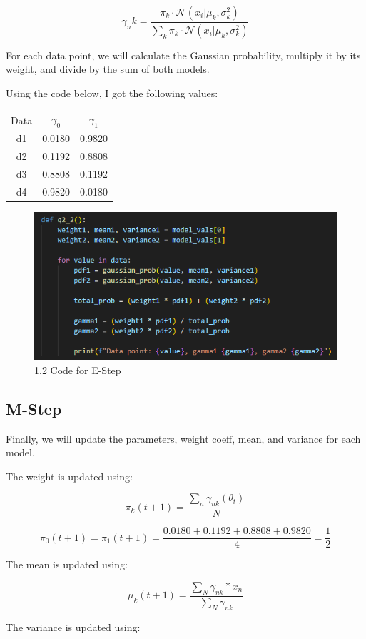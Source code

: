 \documentclass{article}
\begin{document}
\[\gamma_nk = \frac{\pi_k \cdot \mathcal{N}(x_i | \mu_k, \sigma_k^2) }{\sum_{k}\pi_k \cdot \mathcal{N}(x_i | \mu_k, \sigma_k^2)} \]

For each data point, we will calculate the Gaussian probability, multiply it by its weight, and divide by the sum of both models.

Using the code below, I got the following values:

\begin{center}
\begin{tabular}{ c c c }
 Data & $\gamma_0$ & $\gamma_1$ \\
 d1 & 0.0180 & 0.9820 \\ 
 d2 & 0.1192 & 0.8808 \\  
 d3 & 0.8808 & 0.1192 \\
 d4 & 0.9820 & 0.0180 \\  
\end{tabular}
\end{center}

\begin{figure}[H]
    \centering
    \includegraphics[width=0.75\linewidth]{Q1.2 Code.png}
    \caption{1.2 Code for E-Step}
\end{figure}

\subsection{M-Step}
Finally, we will update the parameters, weight coeff, mean, and variance for each model. 

The weight is updated using:

\[\pi_k(t+1) = \frac{\sum_{n}\gamma_{nk}(\theta_t)}{N} \]

\[\pi_0(t+1) = \pi_1(t+1) = \frac{0.0180+0.1192+0.8808+0.9820}{4} = \frac{1}{2} \]

The mean is updated using:

\[\mu_k(t+1) = \frac{\sum_N \gamma_{nk} * x_n}{\sum_N \gamma_{nk}} \]

The variance is updated using:
\end{document}
